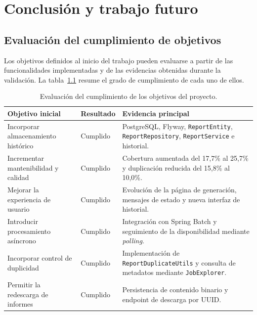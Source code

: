 \documentclass[11pt,a4paper,titlepage,oneside]{report}
\newcommand{\tfgtablestyle}{%
  \small
  \setlength{\tabcolsep}{4pt}%
  \renewcommand{\arraystretch}{1.15}%
  \rowcolors{2}{udcgray!08}{white}%
}
\begin{document}

\chapter{Conclusión y trabajo futuro}

\section{Evaluación del cumplimiento de objetivos}

Los objetivos definidos al inicio del trabajo pueden evaluarse a partir de las
funcionalidades implementadas y de las evidencias obtenidas durante la
validación. La tabla~\ref{tab:cumplimiento-objetivos} resume el grado de
cumplimiento de cada uno de ellos.

\begin{table}[H]
  \centering
  \tfgtablestyle
  \caption{Evaluación del cumplimiento de los objetivos del proyecto.}
  \label{tab:cumplimiento-objetivos}

  \begin{tabularx}{0.97\textwidth}
    {@{}p{}p{}X@{}}

    \toprule
    \rowcolor{udcpink!20}

    \textbf{Objetivo inicial} &
    \textbf{Resultado} &
    \textbf{Evidencia principal} \\

    \midrule

    Incorporar almacenamiento histórico &
    Cumplido &
    PostgreSQL, Flyway, \texttt{ReportEntity},
    \texttt{ReportRepository}, \texttt{ReportService} e historial. \\

    Incrementar mantenibilidad y calidad &
    Cumplido &
    Cobertura aumentada del 17,7\% al 25,7\% y duplicación reducida del
    15,8\% al 10,0\%. \\

    Mejorar la experiencia de usuario &
    Cumplido &
    Evolución de la página de generación, mensajes de estado y nueva
    interfaz de historial. \\

    Introducir procesamiento asíncrono &
    Cumplido &
    Integración con Spring Batch y seguimiento de la disponibilidad mediante
    \textit{polling}. \\

    Incorporar control de duplicidad &
    Cumplido &
    Implementación de \texttt{ReportDuplicateUtils} y consulta de
    metadatos mediante \texttt{JobExplorer}. \\

    Permitir la redescarga de informes &
    Cumplido &
    Persistencia de contenido binario y endpoint de descarga por UUID. \\

    \bottomrule
  \end{tabularx}

\end{table}
\end{document}
